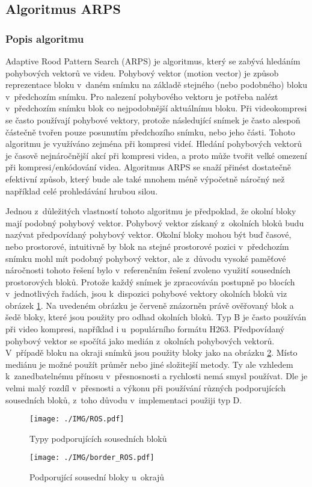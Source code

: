 \documentclass[thesis=M,czech]{FITthesis}[2016/06/26]
\begin{document}
\subsection {Algoritmus ARPS}
\label{arps}
\subsubsection{Popis algoritmu}
Adaptive Rood Pattern Search (ARPS)\cite{ARPS} je algoritmus, který se zabývá hledáním pohybových vektorů ve videu. Pohybový vektor (motion vector) je způsob reprezentace bloku v~daném snímku na základě stejného (nebo podobného) bloku v~předchozím snímku. Pro nalezení pohybového vektoru je potřeba nalézt v~předchozím snímku blok co nejpodobnější aktuálnímu bloku. Při videokompresi se často používají pohybové vektory, protože následující snímek je často alespoň částečně tvořen pouze posunutím předchozího snímku, nebo jeho části.  Tohoto algoritmu je využíváno zejména při kompresi videí. Hledání pohybových vektorů je časově nejnáročnější akcí při kompresi videa, a proto může tvořit velké omezení při kompresi/enkódování videa. Algoritmus ARPS se snaží přinést dostatečně efektivní způsob, který bude ale také mnohem méně výpočetně náročný než například celé prohledávání hrubou silou. 

Jednou z~důležitých vlastností tohoto algoritmu je předpoklad, že okolní bloky mají podobný pohybový vektor. Pohybový vektor získaný z~okolních bloků budu nazývat předpovídaný pohybový vektor. Okolní bloky mohou být buď časové, nebo prostorové, intuitivně by blok na stejné prostorové pozici v~předchozím snímku mohl mít podobný pohybový vektor, ale z~důvodu vysoké paměťové náročnosti tohoto řešení bylo v~referenčním řešení zvoleno využití sousedních prostorových bloků. Protože každý snímek je zpracováván postupně po blocích v~jednotlivých řadách, jsou k~dispozici pohybové vektory okolních bloků viz obrázek \ref{fig:nearby}. Na uvedeném obrázku je červeně znázorněn právě ověřovaný blok a šedě bloky, které jsou použity pro odhad okolních bloků. Typ B je často používán při video kompresi, například i u~populárního formátu H263\cite{H263}. Předpovídaný pohybový vektor se spočítá jako medián z~okolních pohybových vektorů. V~případě bloku na okraji snímků jsou použity bloky jako na obrázku \ref{fig:border}. Místo mediánu je možné použít průměr nebo jiné složitejší metody. Ty ale vzhledem k~zanedbatelnému přínosu v~přesnosnosti a rychlosti nemá smysl používat. Dle \cite{ARPS} je velmi malý rozdíl v~přesnosti a výkonu při používání různých  podporujících sousedních bloků, z~toho důvodu v~implementaci použiji typ D.
\begin{figure}[h]\centering
\texttt{[image: ./IMG/ROS.pdf]}
\caption{Typy podporujících sousedních bloků}
\label{fig:nearby}
\end{figure}
\begin{figure}[h]\centering
\texttt{[image: ./IMG/border\_ROS.pdf]}
\caption{Podporující sousední bloky u~okrajů}
\label{fig:border}
\end{figure}
\end{document}
